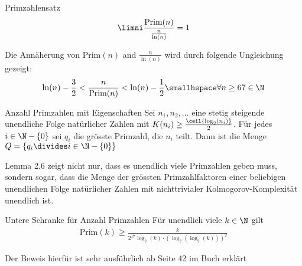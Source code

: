 \begin{theorem}[]{Primzahlensatz}
    \vspace{-0.3cm}
    \begin{align*}
        \limni \frac{\text{Prim}(n)}{\frac{n}{\ln(n)}} = 1
    \end{align*}
\end{theorem}
Die Annäherung von $\text{Prim}(n)$ and $\frac{n}{\ln(n)}$ wird durch folgende Ungleichung gezeigt:
\begin{align*}
    \ln(n) - \frac{3}{2} < \frac{n}{\text{Prim}(n)} < \ln(n) - \frac{1}{2} \smallhspace \forall n \geq 67 \in \N
\end{align*}

\begin{lemma}[]{Anzahl Primzahlen mit Eigenschaften}
    Sei $n_1, n_2, \ldots$ eine stetig steigende unendliche Folge natürlicher Zahlen mit $K(n_i) \geq \frac{\ceil{\log_2(n_i)}}{2}$.
    Für jedes $i \in \N - \{ 0 \}$ sei $q_i$ die grösste Primzahl, die $n_i$ teilt. 
    Dann ist die Menge $Q = \{ q_i \divides i \in \N - \{ 0 \} \}$
\end{lemma}

Lemma 2.6 zeigt nicht nur, dass es unendlich viele Primzahlen geben muss, sondern sogar, dass die Menge der grössten Primzahlfaktoren einer beliebigen unendlichen Folge natürlicher Zahlen mit nichttrivialer Kolmogorov-Komplexität unendlich ist.

\begin{theorem}[]{Untere Schranke für Anzahl Primzahlen}
    Für unendlich viele $k \in \N$ gilt
    \begin{align*}
        \text{Prim}(k) \geq \frac{k}{2^17 \log_2(k) \cdot (\log_2(\log_2(k)))^2}
    \end{align*}
\end{theorem}

Der Beweis hierfür ist sehr ausführlich ab Seite 42 im Buch erklärt
